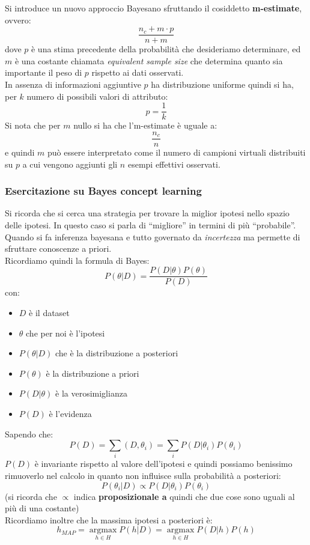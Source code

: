 \documentclass[a4paper,12pt, oneside]{book}
\begin{document}
Si introduce un nuovo approccio Bayesano sfruttando il cosiddetto
\textbf{m-estimate}, ovvero: 
\[\frac{n_c+m\cdot p}{n+m}\]
dove $p$ è una stima precedente della probabilità che desideriamo determinare,
ed $m$ è una costante chiamata \textit{equivalent sample size} che determina
quanto sia importante il peso di $p$ rispetto ai dati osservati.\\
In assenza di informazioni aggiuntive $p$ ha distribuzione uniforme quindi si
ha, per $k$ numero di possibili valori di attributo:
\[p=\frac{1}{k}\]
Si nota che per $m$ nullo si ha che l'm-estimate è uguale a:
\[\frac{n_c}{n}\]
e quindi $m$ può essere interpretato come il numero di campioni virtuali
distribuiti su $p$ a cui vengono aggiunti gli $n$ esempi effettivi osservati.
\subsubsection{Esercitazione su Bayes concept learning}
Si ricorda che si cerca una strategia per trovare la miglior ipotesi nello
spazio delle ipotesi. In questo caso si parla di ``migliore'' in termini di più
``probabile''. \\
Quando si fa inferenza bayesana e tutto governato da \textit{incertezza} ma
permette di sfruttare conoscenze a priori.\\
Ricordiamo quindi la formula di Bayes:
\[P(\theta|D)=\frac{P(D|\theta)P(\theta)}{P(D)}\]
con:
\begin{itemize}
  \item $D$ è il dataset
  \item $\theta$ che per noi è l'ipotesi
  \item $P(\theta|D)$ che è la distribuzione a posteriori
  \item $P(\theta)$ è la distribuzione a priori
  \item $P(D|\theta)$ è la verosimiglianza
  \item $P(D)$ è l'evidenza
\end{itemize}
Sapendo che:
\[P(D)=\sum_i(D, \theta_i)=\sum_i P(D|\theta_i)P(\theta_i)\]
$P(D)$ è invariante rispetto al valore dell'ipotesi e quindi possiamo benissimo
rimuoverlo nel calcolo in quanto non influisce sulla probabilità a posteriori:
\[P(\theta_i|D)\varpropto P(D|\theta_i)P(\theta_i)\]
(si ricorda che $\varpropto$ indica \textbf{proposizionale a} quindi che due
cose sono uguali al più di una costante)\\
Ricordiamo inoltre che la massima ipotesi a posteriori è:
\[h_{MAP}=\operatorname*{argmax}_{h\in H}P(h|D)=
  \operatorname*{argmax}_{h\in H}P(D|h)P(h)\]
\end{document}
